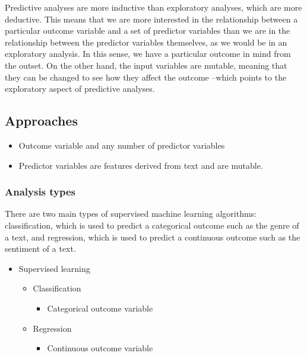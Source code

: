 \documentclass[
  letterpaper,
]{scrbook}
\providecommand{\tightlist}{%
  \setlength{\itemsep}{0pt}\setlength{\parskip}{0pt}}\usepackage{longtable,booktabs,array}
\begin{document}
Predictive analyses are more inductive than exploratory analyses, which
are more deductive. This means that we are more interested in the
relationship between a particular outcome variable and a set of
predictor variables than we are in the relationship between the
predictor variables themselves, as we would be in an exploratory
analysis. In this sense, we have a particular outcome in mind from the
outset. On the other hand, the input variables are mutable, meaning that
they can be changed to see how they affect the outcome --which points to
the exploratory aspect of predictive analyses.

\hypertarget{pda-approaches}{%
\subsection{Approaches}\label{pda-approaches}}

\begin{itemize}
\tightlist
\item
  Outcome variable and any number of predictor variables
\item
  Predictor variables are features derived from text and are mutable.
\end{itemize}

\hypertarget{pda-analysis-types}{%
\subsubsection{Analysis types}\label{pda-analysis-types}}

There are two main types of supervised machine learning algorithms:
classification, which is used to predict a categorical outcome such as
the genre of a text, and regression, which is used to predict a
continuous outcome such as the sentiment of a text.

\begin{itemize}
\tightlist
\item
  Supervised learning

  \begin{itemize}
  \tightlist
  \item
    Classification

    \begin{itemize}
    \tightlist
    \item
      Categorical outcome variable
    \end{itemize}
  \item
    Regression

    \begin{itemize}
    \tightlist
    \item
      Continuous outcome variable
    \end{itemize}
  \end{itemize}
\end{itemize}
\end{document}
